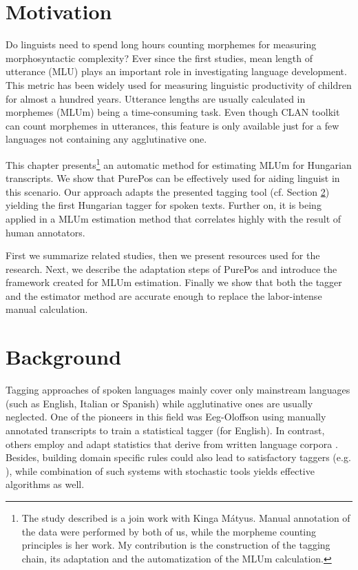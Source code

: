 
\section{Motivation}

Do linguists need to spend long hours counting morphemes for measuring morphosyntactic complexity? 
Ever since the first studies, mean length of utterance (MLU) plays an important role in investigating language development. 
This metric has been widely used for measuring linguistic productivity of children for almost a hundred years. Utterance lengths are usually calculated in morphemes  (MLUm) being a time-consuming task. Even though CLAN toolkit can count morphemes in utterances, this feature is only available just for a few languages not containing any agglutinative one.

This chapter presents\footnote{The study described is a join work with Kinga Mátyus. Manual annotation of the data were performed by both of us, while the morpheme counting principles is her work. My contribution is the construction of the tagging chain, its adaptation and the automatization of the MLUm calculation.} 
an automatic method for estimating MLUm for Hungarian transcripts. 
We show that PurePos can be effectively used for aiding linguist in this scenario. Our approach adapts the presented tagging tool (cf. Section \ref{}) yielding the first Hungarian tagger for spoken texts. Further on, it is being applied in a MLUm estimation method that correlates highly with the result of human annotators. 

First we summarize related studies, then we present resources used for the research. Next, we describe the adaptation steps of PurePos and introduce the framework created for MLUm estimation. Finally we show that both the tagger and the estimator method are accurate enough to replace the labor-intense manual calculation.

\section{Background}

Tagging approaches of spoken languages mainly cover only mainstream languages (such as English, Italian or Spanish) while agglutinative ones are usually neglected. 
One of the pioneers in this field was Eeg-Oloffson \cite{Svartvik1982} using  manually annotated transcripts to train a statistical tagger (for English). In contrast, others employ and adapt statistics that derive from written language corpora \cite{Mendes2004,Nivre1996,Panunzi2004}.
Besides, building domain specific rules could also lead to satisfactory taggers (e.g. \cite{Moreno2003}),
while combination of such systems with stochastic tools \cite{Bick2012} yields effective algorithms as well. 

